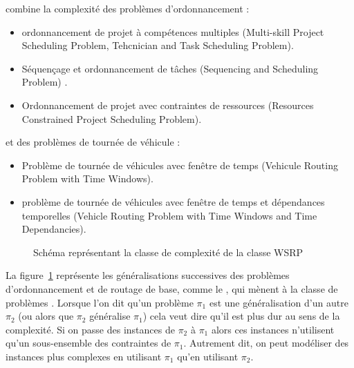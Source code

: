 \wsrp combine la complexité des problèmes d'ordonnancement \cite{Blazewicz1983,Lageweg1982} :
\begin{itemize}
\item ordonnancement de projet à compétences multiples (Multi-skill Project Scheduling Problem, Tehcnician and Task Scheduling Problem).
\item Séquençage et ordonnancement de tâches (Sequencing and Scheduling Problem) \cite{Lawler1993}.
\item Ordonnancement de projet avec contraintes de ressources (Resources Constrained Project Scheduling Problem).
\end{itemize}
et des problèmes de tournée de véhicule \cite{Lenstra2013,Tsitsiklis1992} :
\begin{itemize}
\item Problème de tournée de véhicules avec fenêtre de temps (Vehicule Routing Problem with Time Windows).
\item  problème de tournée de véhicules avec fenêtre de temps et dépendances temporelles (Vehicle Routing Problem with Time Windows and Time Dependancies).
\end{itemize}



\begin{figure}[H]
  \centering
\caption{Schéma représentant la classe de complexité de la classe WSRP \label{fig:complex:gloabale}}
\end{figure}


La figure~\ref{fig:complex:gloabale} représente les généralisations successives des problèmes d'ordonnancement et de routage de base, comme le \tsp, qui mènent à la classe de problèmes \wsrp.
Lorsque l'on dit qu'un problème $\pi_1$ est une généralisation d'un autre $\pi_2$ (ou alors que $\pi_2$ généralise $\pi_1$) cela veut dire qu'il est plus dur au sens de la complexité. 
Si on passe des instances de $\pi_2$ à $\pi_1$ alors ces instances n'utilisent qu'un sous-ensemble des contraintes de $\pi_1$.
Autrement dit, on peut modéliser des instances plus complexes en utilisant $\pi_1$ qu'en utilisant $\pi_2$.


